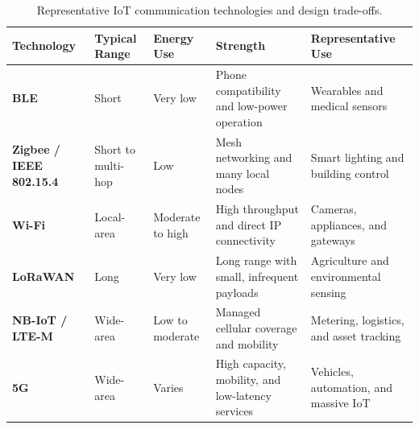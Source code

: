 \begin{table}[!b]
\centering
\caption{Representative IoT communication technologies and design trade-offs.}
\normalsize
  \setlength{\tabcolsep}{2.5pt}
  \renewcommand{\arraystretch}{1.8}
  \begin{tabular}{@{}>{\bfseries\RaggedRight\arraybackslash}p{}
                      >{\Centering\arraybackslash}p{}
                      >{\Centering\arraybackslash}p{}
                      >{\RaggedRight\arraybackslash}p{}
                      >{\RaggedRight\arraybackslash}p{}@{}}
    \toprule
    \textbf{Technology} & \textbf{Typical Range} & \textbf{Energy Use} & \textbf{Strength} & \textbf{Representative Use} \\
    \midrule
    BLE & Short & Very low & Phone compatibility and low-power operation & Wearables and medical sensors \\
    Zigbee / IEEE 802.15.4 & Short to multi-hop & Low & Mesh networking and many local nodes & Smart lighting and building control \\
    Wi-Fi & Local-area & Moderate to high & High throughput and direct IP connectivity & Cameras, appliances, and gateways \\
    LoRaWAN & Long & Very low & Long range with small, infrequent payloads & Agriculture and environmental sensing \\
    NB-IoT / LTE-M & Wide-area & Low to moderate & Managed cellular coverage and mobility & Metering, logistics, and asset tracking \\
    5G & Wide-area & Varies & High capacity, mobility, and low-latency services & Vehicles, automation, and massive IoT \\
    \bottomrule
  \end{tabular}
\end{table}
\newpage

